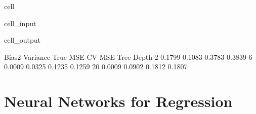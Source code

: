 \documentclass[letterpaper,10pt,english]{jupyterBook}
\begin{document}
\begin{sphinxuseclass}{cell}
\begin{sphinxVerbatimInput}
\begin{sphinxuseclass}{cell_input}
\begin{sphinxVerbatim}[commandchars=\\\{\}]
    \PYG{p}{[}\PYG{p}{]}  
         
         
         
         

  
  
  
\end{sphinxVerbatim}

\end{sphinxuseclass}\end{sphinxVerbatimInput}
\begin{sphinxVerbatimOutput}

\begin{sphinxuseclass}{cell_output}
\begin{sphinxVerbatim}[commandchars=\\\{\}]
            Bias\PYGZca{}2  Variance  True MSE  CV MSE
Tree Depth                                    
2           0.1799    0.1083    0.3783  0.3839
6           0.0009    0.0325    0.1235  0.1259
20          0.0009    0.0902    0.1812  0.1807
\end{sphinxVerbatim}

\end{sphinxuseclass}\end{sphinxVerbatimOutput}

\end{sphinxuseclass}
\sphinxstepscope


\chapter{Neural Networks for Regression}
\label{\detokenize{04:neural-networks-for-regression}}\label{\detokenize{04::doc}}
\end{document}
